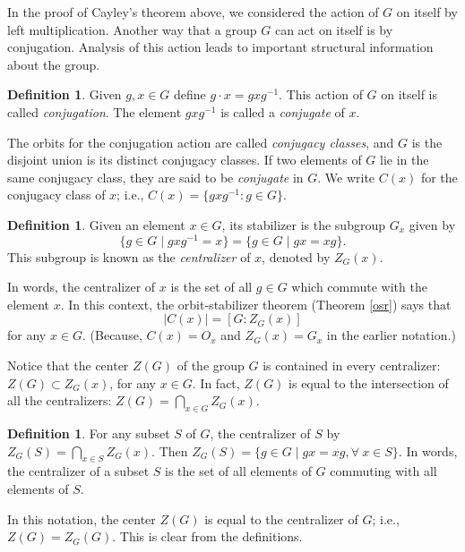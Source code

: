 \documentclass[11pt,oneside]{article}
\theoremstyle{definition}
\newtheorem{defn}[thm]{Definition}
\begin{document}
In the proof of Cayley's theorem above, we considered the action of
$G$ on itself by left multiplication.  Another way that a group $G$
can act on itself is by conjugation.  Analysis of this action leads to
important structural information about the group.


\begin{defn} \label{conj-elt}
Given $g,x \in G$ define $g\cdot x = gxg^{-1}$. This action of $G$ on
itself is called \emph{conjugation}. The element $gxg^{-1}$ is called
a \emph{conjugate} of $x$.
\end{defn}



The orbits for the conjugation action are called {\em conjugacy
  classes}, and $G$ is the disjoint union is
its distinct conjugacy classes. If two elements of $G$ lie in the same
conjugacy class, they are said to be \emph{conjugate} in $G$.  We
write $C(x)$ for the conjugacy class of $x$; i.e.,
$C(x) = \{ gxg^{-1} \colon g \in G\}$.


\begin{defn}
Given an element $x \in G$, its stabilizer is the subgroup $G_x$ given
by
\[
  \{ g\in G \mid gxg^{-1} = x \} = \{ g\in G \mid gx=xg \}.
\]
This subgroup is known as the {\em centralizer} of $x$, denoted by
$Z_G(x)$.
\end{defn}


In words, the centralizer of $x$ is the set of all $g \in G$ which
commute with the element $x$.  In this context, the orbit-stabilizer
theorem (Theorem \ref{osr}) says that
\[
   |C(x)| = [G:Z_G(x)]
\] 
for any $x \in G$. (Because, $C(x)=O_x$ and $Z_G(x)=G_x$ in the
earlier notation.)

Notice that the center $Z(G)$ of the group $G$ is contained in every
centralizer: $Z(G) \subset Z_G(x)$, for any $x\in G$. In fact, $Z(G)$
is equal to the intersection of all the centralizers:
$Z(G)=\bigcap_{x\in G} Z_G(x)$.


\begin{defn}
For any subset $S$ of $G$, the centralizer of $S$ by $Z_G(S) =
\bigcap_{x\in S} Z_G(x)$. Then $Z_G(S) = \{ g\in G \mid gx=xg,
\forall\ x\in S\}$. In words, the centralizer of a subset $S$ is the
set of all elements of $G$ commuting with all elements of $S$.
\end{defn}

In this notation, the center $Z(G)$ is equal to the centralizer of
$G$; i.e., $Z(G) = Z_G(G)$. This is clear from the definitions.
\end{document}
